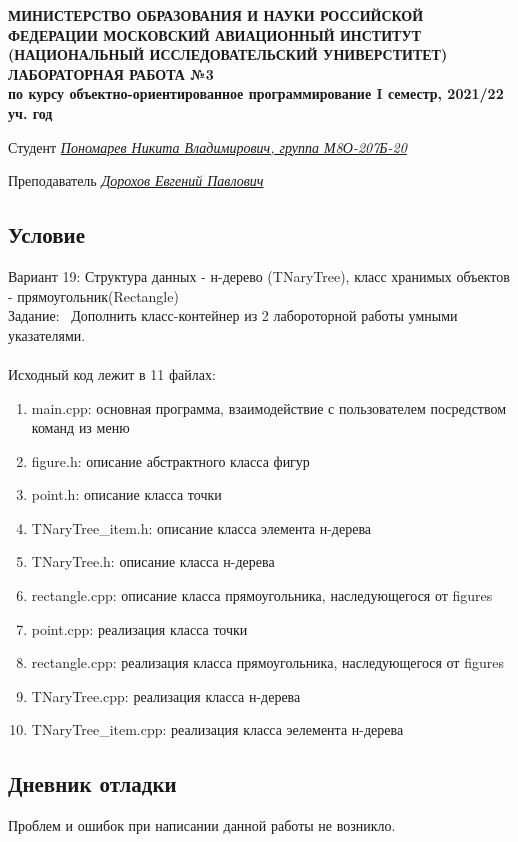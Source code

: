 \documentclass[12pt]{article}
\begin{document}
\begin{titlepage}
\begin{center}
\textbf{МИНИСТЕРСТВО ОБРАЗОВАНИЯ И НАУКИ РОССИЙСКОЙ ФЕДЕРАЦИИ
\medskip
МОСКОВСКИЙ АВИАЦИОННЫЙ ИНСТИТУТ
(НАЦИОНАЛЬНЫЙ ИССЛЕДОВАТЕЛЬСКИЙ УНИВЕРСТИТЕТ)
\vfill\vfill
{\Huge ЛАБОРАТОРНАЯ РАБОТА №3} \\
по курсу объектно-ориентированное программирование
I семестр, 2021/22 уч. год}
\end{center}
\vfill

Студент \uline{\it {Пономарев Никита Владимирович, группа М8О-207Б-20}\hfill}

Преподаватель \uline{\it {Дорохов Евгений Павлович}\hfill}

\vfill
\end{titlepage}

\subsection*{Условие}
Вариант 19:
Структура данных - н-дерево (TNaryTree), класс хранимых объектов - прямоугольник(Rectangle)\\
Задание: \
Дополнить класс-контейнер из 2 лабороторной работы умными указателями.\\
\\

Исходный код лежит в 11 файлах:
\begin{enumerate}
\item main.cpp: основная программа, взаимодействие с пользователем посредством команд из меню
\item figure.h:    описание абстрактного класса фигур
\item point.h:     описание класса точки
\item TNaryTree\_item.h:  описание класса элемента н-дерева
\item TNaryTree.h: описание класса н-дерева
\item rectangle.cpp: описание класса прямоугольника, наследующегося от figures
\item point.cpp:     реализация класса точки
\item rectangle.cpp: реализация класса прямоугольника, наследующегося от figures
\item TNaryTree.cpp:  реализация класса н-дерева
\item TNaryTree\_item.cpp:  реализация класса эелемента н-дерева

\end{enumerate}
\pagebreak
\subsection*{Дневник отладки}
Проблем и ошибок при написании данной работы не возникло.
\end{document}
